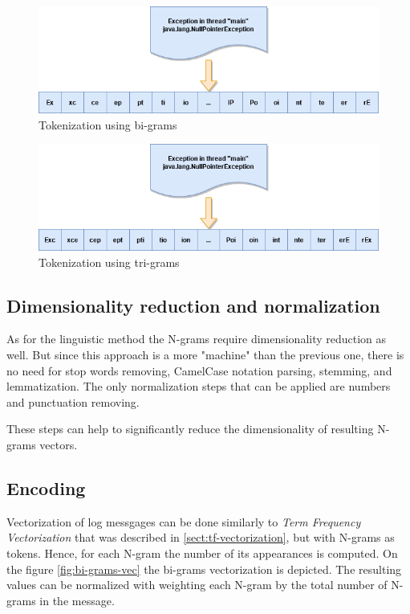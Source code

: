 \documentclass[thesis=M,english]{FITthesis}[2019/12/23]
\begin{document}
\begin{figure}[h!]\centering
	\includegraphics[scale=0.48]{bi_grams}
	\caption{Tokenization using bi-grams}\label{fig:bi-grams}
\end{figure}

\begin{figure}[h!]\centering
	\includegraphics[scale=0.48]{tri_grams}
	\caption{Tokenization using tri-grams}\label{fig:tri-grams}
\end{figure}

\subsection{Dimensionality reduction and normalization}
As for the linguistic method the N-grams require dimensionality reduction as well. But since this approach is a more "machine" than the previous one, there is no need for stop words removing, CamelCase notation parsing, stemming, and lemmatization. The only normalization steps that can be applied are numbers and punctuation removing. 

These steps can help to significantly reduce the dimensionality of resulting N-grams vectors.

\subsection{Encoding}


Vectorization of log messgages can be done similarly to \textit{Term Frequency Vectorization} that was described in \ref{sect:tf-vectorization}, but with N-grams as tokens. Hence, for each N-gram the number of its appearances is computed. On the figure \ref{fig:bi-grams-vec} the bi-grams vectorization is depicted. The resulting values can be normalized with weighting each N-gram by the total number of N-grams in the message.
\end{document}
